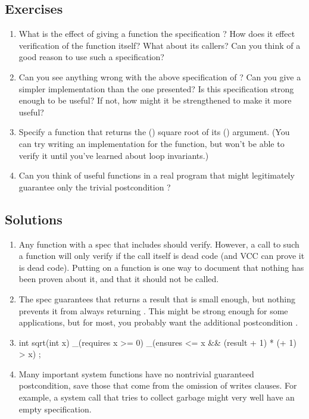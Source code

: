 \subsection*{Exercises}
\begin{enumerate}
\item
What is the effect of giving a function the specification
? How does it effect verification of
the function itself? What about its callers? Can you think of a good 
reason to use such a specification?

\item
Can you see anything wrong with the above specification of ?
Can you give a simpler implementation than the one presented? Is this 
specification strong enough to be useful? If not, how might it be
strengthened to make it more useful?

\item
Specify a function that returns the () square root of its ()
argument. (You can try writing an implementation for the function, but
won't be able to verify it until you've learned about loop
invariants.)

\item
Can you think of useful functions in a real program that might
legitimately guarantee only the trivial postcondition ?
\end{enumerate}

\subsection*{Solutions}
\begin{enumerate}

\item
Any function with a spec that includes  should
verify. However, a call to such a function will only verify if the
call itself is dead code (and VCC can prove it is dead code). Putting
 on a function is one way to document that nothing has
been proven about it, and that it should not be called.

\item
The spec guarantees that  returns a result that is small
enough, but nothing prevents it from always returning
. This might be strong enough for some applications, but
for most, you probably want the additional postcondition
.

\item
\begin{VCC}
int sqrt(int x)
_(requires x >= 0)
_(ensures \result * \result <= x && (result + 1) * (\result + 1) > x)
;
\end{VCC}

\item
Many important system functions have no nontrivial guaranteed
postcondition, save those that come from the omission of writes clauses.
For example, a system call that tries to collect garbage might
very well have an empty specification. 
\end{enumerate}

